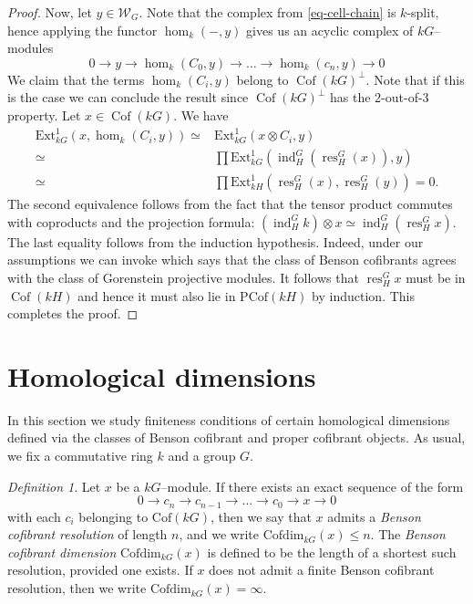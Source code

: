 \documentclass{amsart}
\newcommand{\res}{\operatorname{res}\nolimits}
\newcommand{\ind}{\operatorname{ind}\nolimits}
\def \Wfin{{\mathcal W}_{G}}
\DeclareMathOperator{\Cof}{Cof}
\numberwithin{equation}{section}%
\theoremstyle{remark}
\newtheorem{definition}[equation]{Definition}
\begin{document}
{\begin{proof}
Now, let $y\in \Wfin$.  Note that the complex from \cref{eq-cell-chain} is $k$-split, hence applying the functor $\hom_k(-,y)$ gives us an acyclic complex of $kG$--modules
\[
 0\to y \to \hom_k(C_0,y) \to \ldots \to \hom_k(c_n,y) \to 0
\]
We claim that the terms $\hom_k(C_i,y)$ belong to $\Cof(kG)^\perp$. Note that if this is the case we can conclude the result since $\Cof(kG)^\perp$ has the 2-out-of-3 property. Let $x\in \Cof(kG)$. We have  
 \begin{align*}
         \mathrm{Ext}^1_{kG}(x,\hom_k(C_i,y))\simeq & \mathrm{Ext}^1_{kG}(x\otimes C_i, y) \\ \simeq &   \prod \mathrm{Ext}^1_{kG}(\ind_H^G(\res^G_H(x)),y) \\ 
         \simeq & \prod \mathrm{Ext}^1_{kH}(\res^G_H(x),\res^G_H(y))=0.
    \end{align*}
 The second equivalence follows from the fact that the tensor product commutes with coproducts and  the projection formula: $(\ind_H^Gk)\otimes x \simeq \ind_H^G (\res^G_H x)$. The last equality follows from the induction hypothesis. Indeed, under our assumptions we can invoke \cite[Corollary 2.5]{ET_cof} which says that the class of Benson cofibrants agrees with the class of Gorenstein projective modules. It follows that $\res^G_H x$ must be in $\Cof(kH)$ and hence it must also lie in $\mathrm{PCof}(kH)$ by induction. This completes the proof. 
\end{proof}







\section{Homological dimensions}\label{sec-homological}

In this section we study finiteness conditions of certain homological dimensions defined via the classes of Benson cofibrant and proper cofibrant objects. As usual, we fix a commutative ring $k$ and a group $G$.

\begin{definition} Let $x$ be a $kG$--module.  If there exists an exact sequence of the form 
\[
0\rightarrow c_n\rightarrow c_{n-1}\rightarrow \dots\rightarrow c_0\rightarrow x\rightarrow 0 
\]
with each $c_i$ belonging to $\mathrm{Cof}(kG)$, then we say that $x$ admits a \textit{Benson cofibrant resolution} of length $n$, and we write $\mathrm{Cofdim}_{kG}(x)\leqslant n$.
The \textit{Benson cofibrant dimension} $\mathrm{Cofdim}_{kG}(x)$ is defined to be the length of a shortest such resolution, provided one exists.
If $x$ does not admit a finite Benson cofibrant resolution, then
we write $\mathrm{Cofdim}_{kG}(x)=\infty$.


\end{definition}}
\end{document}
